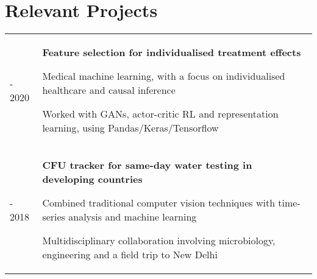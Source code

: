 \documentclass[letterpaper, 10pt]{article}
\begin{document}
\section*{Relevant Projects}
\begin{tabularx}{\linewidth}{>{\raggedleft}p{2.2cm}|p{6.45cm} X}
2019 - 2020 & \multicolumn{2}{p{\linegoal}}{
    \vspace{-2.9mm}\textbf{Feature selection for individualised treatment effects}
    \begin{compact}
        \item Medical machine learning, with a focus on individualised healthcare and causal inference
        \item Worked with GANs, actor-critic RL and representation learning, using Pandas/Keras/Tensorflow
        \vspace{-1.5\baselineskip}
    \end{compact}
}\\
2017 - 2018 & \multicolumn{2}{p{\linegoal}}{
	\vspace{-2.9mm}\textbf{CFU tracker for same-day water testing in developing countries}
	\begin{compact}
		\item Combined traditional computer vision techniques with time-series analysis and machine learning
		\item Multidisciplinary collaboration involving microbiology, engineering and a field trip to New Delhi
		\vspace{-\baselineskip}
	\end{compact}
}\\

\end{tabularx}
\end{document}

